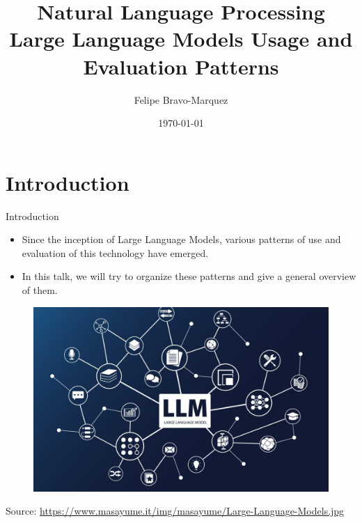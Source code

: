 \documentclass[handout]{beamer}
\title{Natural Language Processing \\ Large Language Models Usage and Evaluation Patterns}
\author[Felipe Bravo Márquez]{\footnotesize
 \textcolor[rgb]{0.00,0.00,1.00}{Felipe Bravo-Marquez}}
\date{\today}
\begin{document}
\begin{frame}
\titlepage


\end{frame}







\section{Introduction}
\begin{frame}{Introduction}
\begin{scriptsize}
\begin{itemize}
\item Since the inception of Large Language Models, various patterns of use and evaluation of this technology have emerged.
\item In this talk, we will try to organize these patterns and give a general overview of them.
\end{itemize}

 \begin{figure}[h]
        	\includegraphics[scale = 0.2]{pics/Large-Language-Models.jpg}
        \end{figure}
Source: \url{https://www.masayume.it/img/masayume/Large-Language-Models.jpg}
\end{scriptsize}
\end{frame}
\end{document}
